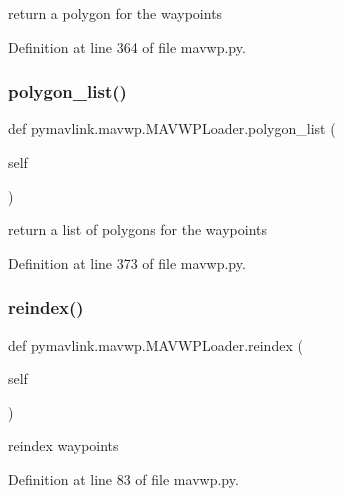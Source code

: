 \begin{DoxyVerb}return a polygon for the waypoints\end{DoxyVerb}
 

Definition at line 364 of file mavwp.\+py.

\mbox{\label{classpymavlink_1_1mavwp_1_1MAVWPLoader_aec3fe4c657e6ee74b219e53f3c43f472}} 
\subsubsection{\texorpdfstring{polygon\_list()}{polygon\_list()}}
{\footnotesize\ttfamily def pymavlink.\+mavwp.\+M\+A\+V\+W\+P\+Loader.\+polygon\+\_\+list (\begin{DoxyParamCaption}\item[{}]{self }\end{DoxyParamCaption})}

\begin{DoxyVerb}return a list of polygons for the waypoints\end{DoxyVerb}
 

Definition at line 373 of file mavwp.\+py.

\mbox{\label{classpymavlink_1_1mavwp_1_1MAVWPLoader_aaaee4bf57d9c77b85ccc155439cacce2}} 
\subsubsection{\texorpdfstring{reindex()}{reindex()}}
{\footnotesize\ttfamily def pymavlink.\+mavwp.\+M\+A\+V\+W\+P\+Loader.\+reindex (\begin{DoxyParamCaption}\item[{}]{self }\end{DoxyParamCaption})}

\begin{DoxyVerb}reindex waypoints\end{DoxyVerb}
 

Definition at line 83 of file mavwp.\+py.

\mbox{\label{classpymavlink_1_1mavwp_1_1MAVWPLoader_a2c039310e8284c9c86abd871be710dd1}} 
